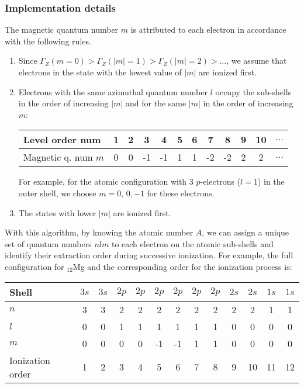 \documentclass[prd, preprint,
aps,
amsmath,
amssymb,
onecolumn,
nofootinbib,
superscriptaddress,
]{revtex4-2}
\begin{document}
	\subsubsection{Implementation details}
	The magnetic quantum number $m$ is attributed to each electron in accordance with the following rules. 
	\begin{enumerate}
		\item Since $\Gamma_Z(m=0)>\Gamma_Z(|m|=1)>\Gamma_Z(|m|=2)>\ldots$, we assume that electrons in the state with the lowest value of $|m|$ are ionized first.
		
		\clearpage
		\item Electrons with the same azimuthal quantum number $l$ occupy the sub-shells in the order of increasing $|m|$ and for the same $|m|$ in the order of increasing $m$:
		\begin{table}[!h]
			\begin{tabular}{l | c | c | c | c | c | c | c | c | c | c | c}
				Level order num & 1 & 2 &  3 &  4 & 5 & 6 &  7 &  8 & 9 & 10 & $\ldots$ \\ \hline
				Magnetic q. num $m$ & 0 & 0 & -1 & -1 & 1 & 1 & -2 & -2 & 2 & 2 & $\ldots$
			\end{tabular}
		\end{table}
		
		For example, for the atomic configuration with 3 $p$-electrons ($l=1$) in the outer shell,  we choose $m=0,\, 0, -1$ for these electrons. 
		
		\item The states with lower $|m|$ are ionized first. 
		
	\end{enumerate}
	With this algorithm, by knowing the atomic number $A$, we can assign a unique set of quantum numbers $nlm$ to each electron on the atomic sub-shells and identify their extraction order during successive ionization. 
	For example, the full configuration for ${}_{12}$Mg and the corresponding order for the ionization process is:
	\begin{table}[h!]
		\begin{tabular}{l | c | c | c | c | c | c | c | c | c | c | c | c}
			Shell & $3s$ & $3s$ & $2p$ & $2p$ & $2p$ & $2p$ & $2p$ & $2p$ & $2s$ & $2s$ & $1s$ & $1s$ \\\hline
			$n$   &    3 &    3 &    2 &    2 &    2 &    2 &    2 &    2 &    2 &    2 &    1 &    1 \\\hline
			$l$   &    0 &    0 &    1 &    1 &    1 &    1 &    1 &    1 &    0 &    0 &    0 &    0 \\\hline
			$m$   &    0 &    0 &    0 &    0 &   -1 &   -1 &    1 &    1 &    0 &    0 &    0 &    0 \\\hline
			Ionization order & 1 & 2 &  3 &  4 & 5 & 6 &  7 &  8 & 9 & 10 & 11 & 12
		\end{tabular}
	\end{table}		
	
\end{document}
